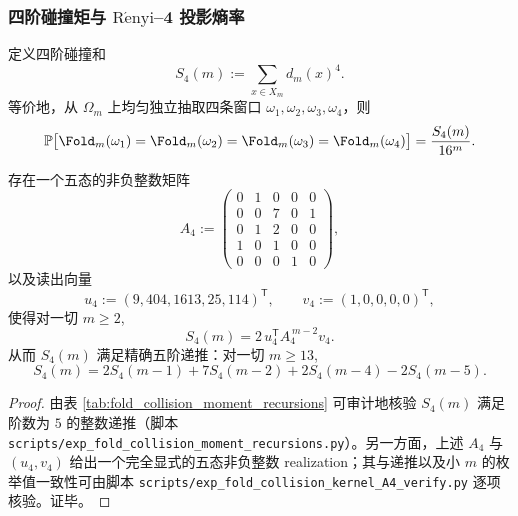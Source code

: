 \subsubsection{四阶碰撞矩与 \texorpdfstring{$\mathrm{R\acute{e}nyi}$}{Renyi}--4 投影熵率}\label{subsec:pom-s4}
\begin{definition}[四阶折叠碰撞矩]\label{def:pom-s4}
定义四阶碰撞和
$$
S_4(m):=\sum_{x\in X_m} d_m(x)^4.
$$
等价地，从 \(\Omega_m\) 上均匀独立抽取四条窗口 \(\omega_1,\omega_2,\omega_3,\omega_4\)，则
$$
\mathbb{P}\bigl[\Fold_m(\omega_1)=\Fold_m(\omega_2)=\Fold_m(\omega_3)=\Fold_m(\omega_4)\bigr]=\frac{S_4(m)}{16^m}.
$$
\end{definition}

\begin{proposition}\label{prop:pom-s4-recurrence}
存在一个五态的非负整数矩阵
$$
A_4:=
\begin{pmatrix}
0&1&0&0&0\\
0&0&7&0&1\\
0&1&2&0&0\\
1&0&1&0&0\\
0&0&0&1&0
\end{pmatrix},
$$
以及读出向量
$$
u_4:=(9,404,1613,25,114)^{\mathsf T},\qquad
v_4:=(1,0,0,0,0)^{\mathsf T},
$$
使得对一切 \(m\ge 2\),
$$
S_4(m)=2\,u_4^{\mathsf T}A_4^{\,m-2}v_4.
$$
从而 \(S_4(m)\) 满足精确五阶递推：对一切 \(m\ge 13\),
$$
S_4(m)=2S_4(m-1)+7S_4(m-2)+2S_4(m-4)-2S_4(m-5).
$$
\end{proposition}
\begin{proof}
由表 \ref{tab:fold_collision_moment_recursions} 可审计地核验 \(S_4(m)\) 满足阶数为 \(5\) 的整数递推（脚本 \texttt{scripts/exp\_fold\_collision\_moment\_recursions.py}）。另一方面，上述 \(A_4\) 与 \((u_4,v_4)\) 给出一个完全显式的五态非负整数 realization；其与递推以及小 \(m\) 的枚举值一致性可由脚本 \texttt{scripts/exp\_fold\_collision\_kernel\_A4\_verify.py} 逐项核验。证毕。
\end{proof}

